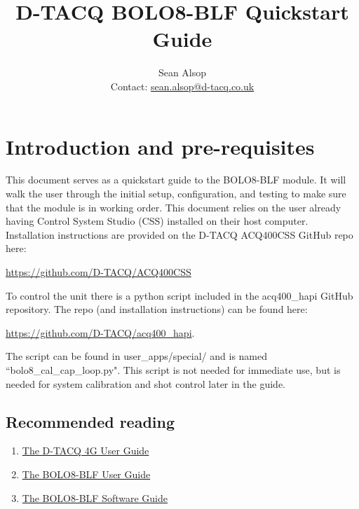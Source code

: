 \documentclass{article}
\begin{document}
\title{D-TACQ BOLO8-BLF Quickstart Guide}
\author{Sean Alsop \\ Contact: \href{mailto:sean.alsop@d-tacq.co.uk}{sean.alsop@d-tacq.co.uk} }

\maketitle


\tableofcontents

\section{Introduction and pre-requisites}
This document serves as a quickstart guide to the BOLO8-BLF module.
It will walk the user through the initial setup, configuration, and testing to make sure that the module is in working order.
This document relies on the user already having Control System Studio (CSS) installed on their host computer.
Installation instructions are provided on the D-TACQ ACQ400CSS GitHub repo here:
\newline
\centerline{ \href{https://github.com/D-TACQ/ACQ400CSS}{https://github.com/D-TACQ/ACQ400CSS} }
\newline
To control the unit there is a python script included in the acq400\_hapi GitHub repository.
The repo (and installation instructions) can be found here:
\newline
\centerline{ \href{https://github.com/D-TACQ/acq400_hapi}{https://github.com/D-TACQ/acq400\_hapi}. }
\newline
The script can be found in user\_apps/special/ and is named ``bolo8\_cal\_cap\_loop.py".
This script is not needed for immediate use, but is needed for system calibration and shot control later in the guide.
\newpage
\subsection{Recommended reading}
\begin{enumerate}
	\item \href{http://www.d-tacq.com/resources/d-tacq-4G-acq4xx-UserGuide-r28.pdf}{The D-TACQ 4G User Guide}
	\item \href{http://www.d-tacq.com/resources/Bolo_calibration_report_user-guide.pdf}{The BOLO8-BLF User Guide}
	\item \href{https://github.com/seanalsop/bolodsp-doc/releases}{The BOLO8-BLF Software Guide}
\end{enumerate}
\end{document}
